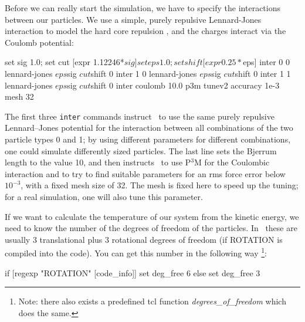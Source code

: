 Before we can really start the simulation, we have to specify the
interactions between our particles.  We use a simple, purely repulsive
Lennard-Jones interaction to model the hard core repulsion
\citep{grest86a}, and the charges interact via the Coulomb potential:
\begin{tclcode}
set sig 1.0; set cut   [expr 1.12246*$sig]
set eps 1.0; set shift [expr 0.25*$eps]
inter 0 0 lennard-jones $eps $sig $cut $shift 0
inter 1 0 lennard-jones $eps $sig $cut $shift 0
inter 1 1 lennard-jones $eps $sig $cut $shift 0
inter coulomb 10.0 p3m tunev2 accuracy 1e-3 mesh 32
\end{tclcode}
The first three \verb|inter| commands instruct \es\ to use the same purely
repulsive Lennard--Jones potential for the interaction between all combinations
of the two particle types 0 and 1; by using different parameters for different
combinations, one could simulate differently sized particles.  The last line sets
the Bjerrum length to the value 10, and then
instructs \es\ to use P$^3$M for the Coulombic interaction and to try to find
suitable parameters for an rms force error below $10^{-3}$, with a fixed mesh
size of 32. The mesh is fixed here to speed up the tuning; for a real
simulation, one will also tune this parameter.

If we want to calculate the temperature of our system from the kinetic energy,
we need to know the number of the degrees of freedom of the particles.
In \es\ these are usually 3 translational plus 3 rotational degrees of freedom
(if ROTATION is compiled into the code). You can get this number
in the following way \footnote{Note: there also exists a predefined tcl function {\it degrees_of_freedom} which does the same.}:

\begin{tclcode}
   if { [regexp "ROTATION" [code_info]] } { 
     set deg_free 6
   } else { set deg_free 3 }
\end{tclcode}

